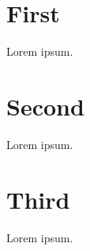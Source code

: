 \section{First} \label{sec:first}
Lorem ipsum.

\section{Second} \label{sec:second}
Lorem ipsum.

\section{Third} \label{sec:third}
Lorem ipsum.